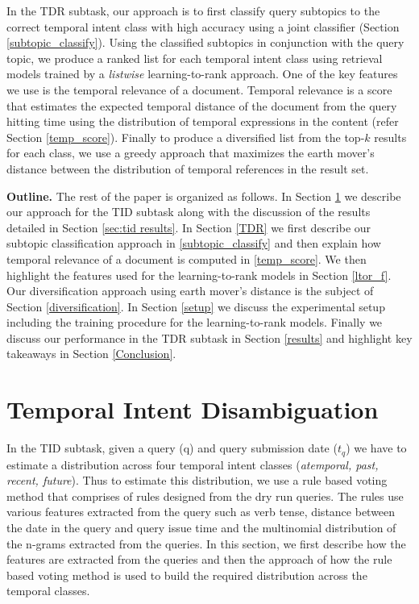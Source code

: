 \documentclass{sig-alternate}
\begin{document}
In the TDR subtask, our approach is to first classify query subtopics to the correct temporal intent class with high accuracy using a joint classifier (Section \ref{subtopic_classify}). Using the classified subtopics in conjunction with the query topic, we produce a ranked list for each temporal intent class using retrieval models trained by a \textit{listwise} learning-to-rank approach. One of the key features we use is the temporal relevance of a document. Temporal relevance is a score that estimates the expected temporal distance of the document from the query hitting time using the distribution of temporal expressions in the content (refer Section \ref{temp_score}). Finally to produce a diversified list from the top-$k$ results for each class, we use a greedy approach that maximizes the earth mover's distance between the distribution of temporal references in the result set.

\textbf{Outline.} The rest of the paper is organized as follows. In Section \ref{TID} we describe our approach for the TID subtask along with the discussion of the results detailed in Section \ref{sec:tid results}.
In Section \ref{TDR} we first describe our subtopic classification approach in \ref{subtopic_classify} and then explain how temporal relevance of a document is computed in \ref{temp_score}. We then highlight the features used for the learning-to-rank models in Section \ref{ltor_f}. Our diversification approach using earth mover's distance is the subject of Section \ref{diversification}. In Section \ref{setup} we discuss the experimental setup including the training procedure for the learning-to-rank models. Finally we discuss our performance in the TDR subtask in Section \ref{results} and highlight key takeaways in Section \ref{Conclusion}.





\section{Temporal Intent Disambiguation}\label{TID}
In the TID subtask, given a query (q) and query submission date ($t_{q}$) we have to estimate a distribution across four temporal intent classes (\textit{atemporal, past, recent, future}). Thus to estimate this distribution, we use a rule based voting method that comprises of rules designed from the dry run queries. The rules use various features extracted from the query such as verb tense, distance between the date in the query and query issue time and the multinomial distribution of the n-grams extracted from the queries. In this section, we first describe how the features are extracted from the queries and then the approach of how the rule based voting method is used to build the required distribution across the temporal classes.
\end{document}

